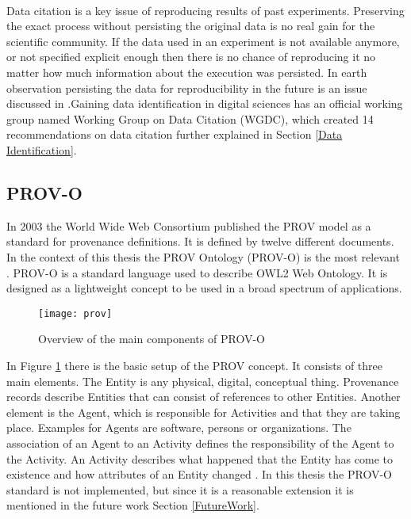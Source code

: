 \documentclass[draft,final]{vutinfth} %
\begin{document}
\\
Data citation is a key issue of reproducing results of past experiments. Preserving the exact process without persisting the original data is no real gain for the scientific community. If the data used in an experiment is not available anymore, or not specified explicit enough then there is no chance of reproducing it no matter how much information about the execution was persisted. In earth observation persisting the data for reproducibility in the future is an issue discussed in \cite{6352411}.Gaining data identification in digital sciences has an official working group named Working Group on Data Citation (WGDC), which created 14 recommendations on data citation further explained in Section \ref{Data Identification}.
 \subsection{PROV-O}\label{PROV}
In 2003 the World Wide Web Consortium published the PROV model as a standard for provenance definitions. It is defined by twelve different documents. In the context of this thesis the PROV Ontology (PROV-O) is the most relevant \cite{f06eee9045b445be89cf07100b3ce05c}. 
PROV-O is a standard language used to describe OWL2 Web Ontology. It is designed as a lightweight concept to be used in a broad spectrum of applications. 

\begin{figure}[h]
	\centering
	\texttt{[image: prov]}
	\caption{Overview of the main components of PROV-O \cite{733f89c65e4844f9aabcae1c276a5602}}
	\label{fig:prov} %
\end{figure}

In Figure \ref{fig:prov} there is the basic setup of the PROV concept. It consists of three main elements. The Entity is any physical, digital, conceptual thing. Provenance records describe Entities that can consist of references to other Entities. Another element is the Agent, which is responsible for Activities and that they are taking place. Examples for Agents are software, persons or organizations. The association of an Agent to an Activity defines the responsibility of the Agent to the Activity. An Activity describes what happened that the Entity has come to existence and how attributes of an Entity changed \cite{f06eee9045b445be89cf07100b3ce05c}. In this thesis the PROV-O standard is not implemented, but since it is a reasonable extension it is mentioned in the future work Section \ref{FutureWork}.
\end{document}
